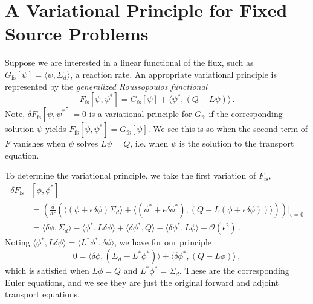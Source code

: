 \section*{A Variational Principle for Fixed Source Problems}

Suppose we are interested in a linear functional of the flux, such 
as $G_{\text{fs}}[\psi] = \langle \psi, \Sigma_d \rangle$, a reaction rate. 
An appropriate variational principle is represented by 
the \textit{generalized Roussopoulos functional}
\begin{equation}
 F_{\text{fs}} [\psi,\psi^*] = 
   G_{\text{fs}}[\psi] + \langle \psi^*, (Q-L\psi) \rangle \, .
\end{equation}
Note, $\delta F_{\text{fs}}[\psi,\psi^*] = 0$ is a variational principle 
for $G_{\text{fs}}$ if the corresponding solution $\psi$ 
yields $F_{\text{fs}}[\psi,\psi^*] = G_{\text{fs}}[\psi]$.  We see this is 
so when the second term of $F$ vanishes when $\psi$ solves $L\psi = Q$, i.e. 
when $\psi$ is the solution to the transport equation.

To determine the variational principle, we take the first variation 
of $F_{\text{fs}}$,
\begin{equation}
 \begin{split}
  \delta F_{\text{fs}} & [\phi,\phi^*] \\
   &= \left ( \frac{d}{d\epsilon} 
            \left ( \langle (\phi+\epsilon \delta \phi) \Sigma_d \rangle + 
                    \langle (\phi^* + \epsilon \delta \phi^*), 
                            (Q-L(\phi+\epsilon \delta \phi)) \rangle 
            \right ) 
    \right ) \Bigg|_{\epsilon=0} \\
   &= \langle \delta \phi, \Sigma_d \rangle - 
      \langle \phi^*,L \delta \phi \rangle + 
      \langle \delta \phi^*, Q \rangle - 
      \langle \delta \phi^*, L \phi \rangle +
      \mathcal{O}(\epsilon^2) \, .
 \end{split}
\end{equation}
Noting 
$\langle \phi^*,L\delta \phi \rangle = \langle L^* \phi^*,\delta \phi \rangle$, 
we have for our principle 
\begin{equation}
 0 = \langle \delta \phi, (\Sigma_d - L^* \phi^*) \rangle + 
     \langle \delta \phi^*, (Q-L\phi) \rangle \, ,
\end{equation}
which is satisfied when $L\phi = Q$ and $L^* \phi^* = \Sigma_d$.  These are 
the corresponding Euler equations, and we see they are just the original 
forward and adjoint transport equations.

